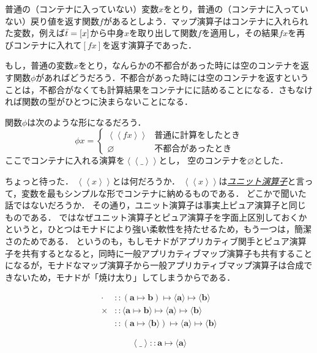 \documentclass[a5paper,draft]{jsbook}
\newcommand{\keyword}[1]{{\underline{\emph{#1}}}}
\newcommand{\mathTypeParameter}[1]{\mathbf{#1}}
\newcommand{\mathListVar}[1]{\Bar{#1}}
\newcommand{\mathPureWith}[1]{\left\langle#1\right\rangle}
\newcommand{\mathUnitWith}[1]{\left\langle\!\left\langle#1\right\rangle\!\right\rangle}
\newcommand{\mathPureNothing}{\varnothing}
\newcommand{\mathAny}{\_}
\newcommand{\mathApplicativeGeneralMap}{\mathbin{\times}}
\newcommand{\mathGeneralMap}{\mathbin{\cdot}}
\newcommand{\mathIn}{\mathrel{::}}
\newcommand{\mathMapsTo}{\mapsto}
\newcommand{\mathMorph}[2]{#1\mathMapsTo#2}
\newcommand{\mathMorphII}[3]{#1\mathMapsTo#2\mathMapsTo#3}
\DeclareMathOperator{\hsklMonadMap}{{DO NOT USE}--\heartsuit}
\begin{document}
普通の（コンテナに入っていない）変数$x$をとり，普通の（コンテナに入っていない）戻り値を返す関数$f$があるとしよう．マップ演算子はコンテナに入れられた変数，例えば$\mathListVar{t}=[x]$から中身$x$を取り出して関数$f$を適用し，その結果$fx$を再びコンテナに入れて$[fx]$を返す演算子であった．

もし，普通の変数$x$をとり，なんらかの不都合があった時には空のコンテナを返す関数$\phi$があればどうだろう．不都合があった時には空のコンテナを返すということは，不都合がなくても計算結果をコンテナにに詰めることになる．さもなければ関数の型がひとつに決まらないことになる．

関数$\phi$は次のような形になるだろう．
$$\phi x=\begin{cases}\mathUnitWith{fx}&\text{普通に計算をしたとき}\\
\mathPureNothing&\text{不都合があったとき}\end{cases}$$
ここでコンテナに入れる演算を$\mathUnitWith{\mathAny}$とし，
空のコンテナを$\mathPureNothing$とした．

ちょっと待った．
$\mathUnitWith{x}$とは何だろうか．
$\mathUnitWith{x}$は\keyword{ユニット演算子}と言って，変数を最もシンプルな形でコンテナに納めるものである．
どこかで聞いた話ではないだろうか．
その通り，ユニット演算子は事実上ピュア演算子と同じものである．
ではなぜユニット演算子とピュア演算子を字面上区別しておくかというと，ひとつはモナドにより強い柔軟性を持たせるため，もう一つは，簡潔さのためである．
というのも，もしモナドがアプリカティブ関手とピュア演算子を共有するとなると，同時に一般アプリカティブマップ演算子も共有することになるが，モナドなマップ演算子から一般アプリカティブマップ演算子は合成できないため，モナドが「焼け太り」してしまうからである．

\begin{align*}
\mathGeneralMap&\mathIn{}\mathMorphII{(\mathMorph{\mathTypeParameter{a}}{\mathTypeParameter{b}})}{\langle\mathTypeParameter{a}\rangle}{\langle\mathTypeParameter{b}
\rangle}\\
\mathApplicativeGeneralMap&\mathIn{}\mathMorphII{\langle\mathMorph{\mathTypeParameter{a}}{\mathTypeParameter{b}}\rangle}{\langle\mathTypeParameter{a}\rangle}{\langle\mathTypeParameter{b}\rangle}\\
\hsklMonadMap&\mathIn{}\mathMorphII{(\mathMorph{\mathTypeParameter{a}}{\langle\mathTypeParameter{b}\rangle})}{\langle\mathTypeParameter{a}\rangle}{\langle{\mathTypeParameter{b}}\rangle}
\end{align*}

$$\mathPureWith{\mathAny}\mathIn\mathMorph{\mathTypeParameter{a}}{\langle\mathTypeParameter{a}\rangle}$$
\end{document}
